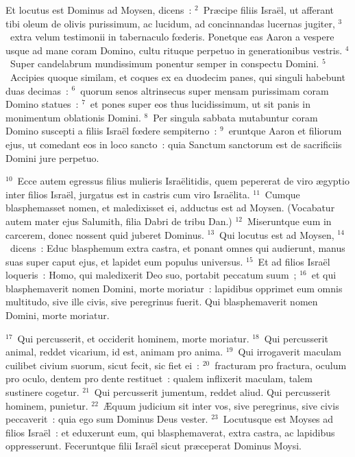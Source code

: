 \lettrine[lines=3,image=true,loversize=0.05,lraise=-0.03]{E}{}t locutus est Dominus ad Moysen, dicens~:
${}^{2}$~Pr\ae cipe filiis Isra\"el, ut afferant tibi oleum de olivis purissimum, ac lucidum, ad concinnandas lucernas jugiter,
${}^{3}$~extra velum testimonii in tabernaculo fœderis. Ponetque eas Aaron a vespere usque ad mane coram Domino, cultu rituque perpetuo in generationibus vestris.
${}^{4}$~Super candelabrum mundissimum ponentur semper in conspectu Domini.
${}^{5}$~Accipies quoque similam, et coques ex ea duodecim panes, qui singuli habebunt duas decimas~:
${}^{6}$~quorum senos altrinsecus super mensam purissimam coram Domino statues~:
${}^{7}$~et pones super eos thus lucidissimum, ut sit panis in monimentum oblationis Domini.
${}^{8}$~Per singula sabbata mutabuntur coram Domino suscepti a filiis Isra\"el fœdere sempiterno~:
${}^{9}$~eruntque Aaron et filiorum ejus, ut comedant eos in loco sancto~: quia Sanctum sanctorum est de sacrificiis Domini jure perpetuo.


${}^{10}$~Ecce autem egressus filius mulieris Isra\"elitidis, quem pepererat de viro \ae gyptio inter filios Isra\"el, jurgatus est in castris cum viro Isra\"elita.
${}^{11}$~Cumque blasphemasset nomen, et maledixisset ei, adductus est ad Moysen. (Vocabatur autem mater ejus Salumith, filia Dabri de tribu Dan.)
${}^{12}$~Miseruntque eum in carcerem, donec nossent quid juberet Dominus.
${}^{13}$~Qui locutus est ad Moysen,
${}^{14}$~dicens~: Educ blasphemum extra castra, et ponant omnes qui audierunt, manus suas super caput ejus, et lapidet eum populus universus.
${}^{15}$~Et ad filios Isra\"el loqueris~: Homo, qui maledixerit Deo suo, portabit peccatum suum~;
${}^{16}$~et qui blasphemaverit nomen Domini, morte moriatur~: lapidibus opprimet eum omnis multitudo, sive ille civis, sive peregrinus fuerit. Qui blasphemaverit nomen Domini, morte moriatur.


${}^{17}$~Qui percusserit, et occiderit hominem, morte moriatur.
${}^{18}$~Qui percusserit animal, reddet vicarium, id est, animam pro anima.
${}^{19}$~Qui irrogaverit maculam cuilibet civium suorum, sicut fecit, sic fiet ei~:
${}^{20}$~fracturam pro fractura, oculum pro oculo, dentem pro dente restituet~: qualem inflixerit maculam, talem sustinere cogetur.
${}^{21}$~Qui percusserit jumentum, reddet aliud. Qui percusserit hominem, punietur.
${}^{22}$~\AE quum judicium sit inter vos, sive peregrinus, sive civis peccaverit~: quia ego sum Dominus Deus vester.
${}^{23}$~Locutusque est Moyses ad filios Isra\"el~: et eduxerunt eum, qui blasphemaverat, extra castra, ac lapidibus oppresserunt. Feceruntque filii Isra\"el sicut pr\ae ceperat Dominus Moysi.

